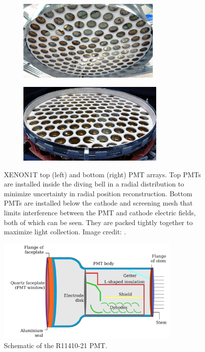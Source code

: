 \begin{figure}
    \centering
    \begin{subfigure}[t]{0.5\textwidth}
        \centering
        \includegraphics[height=4cm, left]{PMTTopArray}
    \end{subfigure}%
    \begin{subfigure}[t]{0.5\textwidth}
        \centering
        \includegraphics[height=4cm, right]{PMTBottomArray}
    \end{subfigure}
    \caption{XENON1T top (left) and bottom (right) PMT arrays.  Top PMTs are installed inside the diving bell in a radial distribution
    to minimize uncertainty in radial position reconstruction.  Bottom PMTs are installed below the cathode and screening mesh that
    limits interference between the PMT and cathode electric fields, both of which can be seen.  They are packed tightly
    together to maximize light collection.  Image credit: .}
	\label{fig:xenon1t_pmt_array}
\end{figure}

\begin{figure}
\centering
\includegraphics[width=0.8\textwidth]{PMTSchematic}
\caption{Schematic of the R11410-21 PMT.}
\label{fig:xenon1t_hamamatsu_pmt}
\end{figure}

